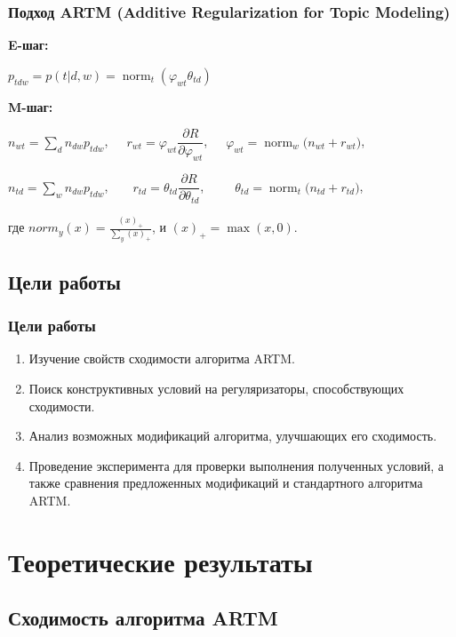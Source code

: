 \documentclass[utf8]{beamer}
\DeclareMathOperator{\norm}{norm}
\renewcommand{\phi}{\varphi}
\begin{document}
 	\begin{frame}
		\frametitle{Подход ARTM (Additive Regularization for Topic Modeling)}   
   		\textbf{E-шаг:}	
   		 
   		 \qquad $p_{tdw} = p(t|d, w) = \norm_t(\varphi_{wt} \theta_{td})$ 		 
 		\medskip
 		
 		\textbf{M-шаг:}
    
 		\qquad $n_{wt} = \sum\limits_{d} n_{dw} p_{tdw}$,\ \ \ $r_{wt} =  \phi_{wt}\dfrac{\partial R}{\partial\phi_{wt}}$,\ \ \  $\phi_{wt}   = \norm_w\big(n_{wt} + r_{wt}\big)$,

 		\qquad $n_{td} = \sum\limits_{w} n_{dw} p_{tdw}$,\ \ \  \ $r_{td} =  \theta_{td}\dfrac{\partial R}{\partial\theta_{td}}$,\ \ \ \ \ $\theta_{td} = \norm_t  \big(n_{td} + r_{td}\big)$,
\medskip

	где $norm_y(x) = \frac{(x)_{+}}{\sum\limits_y (x)_{+}}$, и $(x)_{+} = \max(x, 0)$.	
	\end{frame}
	
	\subsection{Цели работы}	
	\begin{frame}
		\frametitle{Цели работы}
		\begin{enumerate}
			\item Изучение свойств сходимости алгоритма ARTM. 
			\item Поиск конструктивных условий на регуляризаторы, способствующих сходимости.
			\item Анализ возможных модификаций алгоритма, улучшающих его сходимость.
			\item Проведение эксперимента для проверки выполнения полученных условий, а также сравнения предложенных модификаций и стандартного алгоритма ARTM.
		\end{enumerate}
	\end{frame}


	\section{Теоретические результаты}
	\subsection{Сходимость алгоритма ARTM}
	
\end{document}
